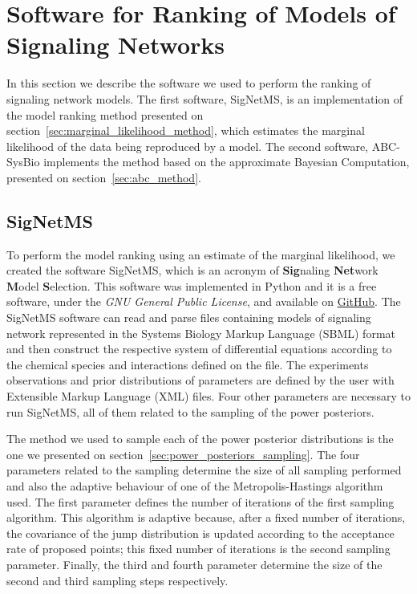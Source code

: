 \section{Software for Ranking of Models of Signaling Networks}
In this section we describe the software we used to perform the ranking
of signaling network models. The first software, SigNetMS, is an 
implementation of the model ranking method presented on 
section~\ref{sec:marginal_likelihood_method}, which estimates the 
marginal likelihood of the data being reproduced by a model.  The second 
software, ABC-SysBio implements the method based on the approximate 
Bayesian Computation, presented on section~\ref{sec:abc_method}.

\subsection{SigNetMS}
To perform the model ranking using an estimate of the marginal 
likelihood, we created the software SigNetMS, which is an acronym of 
{\bf Sig}naling {\bf Net}work {\bf M}odel {\bf S}election. This software
was implemented in Python and it is a free software, under the \emph{GNU 
General Public License}, and available on
\href{https://github.com/gustavoem/SigNetMS}{GitHub}. The SigNetMS 
software can read and parse files containing models of signaling network 
represented in the Systems Biology Markup Language (SBML) format and 
then construct the respective system of differential equations according 
to the chemical species and interactions defined on the file. The 
experiments observations and prior distributions of parameters are 
defined by the user with Extensible Markup Language (XML) files. Four 
other parameters are necessary to run SigNetMS, all of them related to 
the sampling of the power posteriors. 

The method we used to sample each of the power posterior distributions
is the one we presented on section~\ref{sec:power_posteriors_sampling}.
The four parameters related to the sampling determine the size of all
sampling  performed and also the adaptive behaviour of one of the 
Metropolis-Hastings algorithm used. The first parameter defines the 
number of iterations of the first sampling algorithm. This algorithm is 
adaptive because, after a fixed number of iterations, the covariance of 
the jump distribution is updated according to the acceptance rate of 
proposed points; this fixed number of iterations is the second sampling 
parameter. Finally, the third and fourth parameter determine the size of
the second and third sampling steps respectively.

